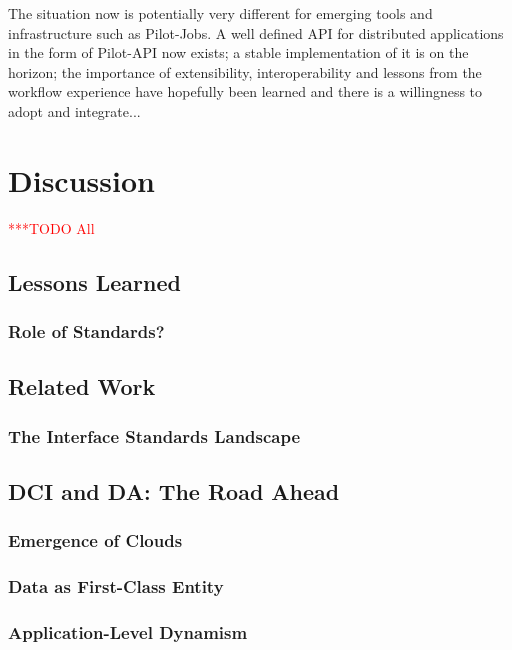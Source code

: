 \documentclass[a4paper,10pt]{article}
\newcommand{\todo}[1]{     {\textcolor{red}  { ***TODO      #1 }}}
\newcommand{\todo}[1]{}
\begin{document}
The situation now is potentially very different for emerging tools and
infrastructure such as Pilot-Jobs. A well defined API for distributed
applications in the form of Pilot-API now exists; a stable
implementation of it is on the horizon; the importance of
extensibility, interoperability and lessons from the workflow
experience have hopefully been learned and there is a willingness to
adopt and integrate...

\section{Discussion}\todo{All}

\subsection{Lessons Learned}

\subsubsection{Role of Standards?}

\subsection{Related Work}

\subsubsection{The Interface Standards Landscape}\label{interface_landscape}

\subsection{DCI and DA: The Road Ahead}

\subsubsection{Emergence of Clouds}

\subsubsection{Data as First-Class Entity}

\subsubsection{Application-Level Dynamism}

 
\end{document}
